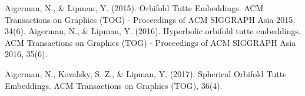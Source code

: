 \documentclass[journal, a4paper]{IEEEtran}
\begin{document}
\begin{thebibliography}{5}

    Aigerman, N., \& Lipman, Y. (2015). Orbifold Tutte Embeddings. ACM Transactions on Graphics (TOG) - Proceedings of ACM SIGGRAPH Asia 2015, 34(6). 
    Aigerman, N., \& Lipman, Y. (2016). Hyperbolic orbifold tutte embeddings. ACM Transactions on Graphics (TOG) - Proceedings of ACM SIGGRAPH Asia 2016, 35(6). 

Aigerman, N., Kovalsky, S. Z., \& Lipman, Y. (2017). Spherical Orbifold Tutte Embeddings. ACM Transactions on Graphics (TOG), 36(4). 


\end{thebibliography}

\end{document}
